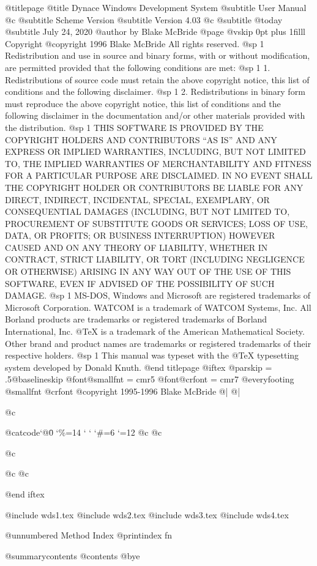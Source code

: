 @titlepage
@title Dynace Windows Development System
@subtitle User Manual
@c @subtitle Scheme Version
@subtitle Version 4.03
@c @subtitle @today{}
@subtitle July 24, 2020
@author by Blake McBride
@page
@vskip 0pt plus 1filll
Copyright  @copyright{} 1996 Blake McBride
All rights reserved.
@sp 1
Redistribution and use in source and binary forms, with or without
modification, are permitted provided that the following conditions are
met:
@sp 1
1. Redistributions of source code must retain the above copyright
notice, this list of conditions and the following disclaimer.
@sp 1
2. Redistributions in binary form must reproduce the above copyright
notice, this list of conditions and the following disclaimer in the
documentation and/or other materials provided with the distribution.
@sp 1
THIS SOFTWARE IS PROVIDED BY THE COPYRIGHT HOLDERS AND CONTRIBUTORS
``AS IS'' AND ANY EXPRESS OR IMPLIED WARRANTIES, INCLUDING, BUT NOT
LIMITED TO, THE IMPLIED WARRANTIES OF MERCHANTABILITY AND FITNESS FOR
A PARTICULAR PURPOSE ARE DISCLAIMED. IN NO EVENT SHALL THE COPYRIGHT
HOLDER OR CONTRIBUTORS BE LIABLE FOR ANY DIRECT, INDIRECT, INCIDENTAL,
SPECIAL, EXEMPLARY, OR CONSEQUENTIAL DAMAGES (INCLUDING, BUT NOT
LIMITED TO, PROCUREMENT OF SUBSTITUTE GOODS OR SERVICES; LOSS OF USE,
DATA, OR PROFITS; OR BUSINESS INTERRUPTION) HOWEVER CAUSED AND ON ANY
THEORY OF LIABILITY, WHETHER IN CONTRACT, STRICT LIABILITY, OR TORT
(INCLUDING NEGLIGENCE OR OTHERWISE) ARISING IN ANY WAY OUT OF THE USE
OF THIS SOFTWARE, EVEN IF ADVISED OF THE POSSIBILITY OF SUCH DAMAGE.
@sp 1
MS-DOS, Windows and Microsoft are registered trademarks of
Microsoft Corporation.  WATCOM is a trademark of WATCOM Systems,
Inc. All Borland products are trademarks or registered trademarks of
Borland International, Inc. @TeX{} is a trademark of the American
Mathematical Society. Other brand and product names are trademarks or
registered trademarks of their respective holders.
@sp 1
This manual was typeset with the @TeX{} typesetting system developed by
Donald Knuth.
@end titlepage
@iftex
@parskip = .5@baselineskip
@font@smallfnt = cmr5
@font@crfont = cmr7
@everyfooting {@smallfnt {@crfont @copyright{}} 1995-1996 Blake McBride} @| @|

@c {@catcode`@\=0 \catcode`\%=14 \catcode` \catcode` \catcode `\#=6 \catcode `\@=12
@c 
@c 
@c 
@c %
@c }

@end iftex



@include wds1.tex
@include wds2.tex
@include wds3.tex
@include wds4.tex


@unnumbered Method Index
@printindex fn

@summarycontents
@contents
@bye


